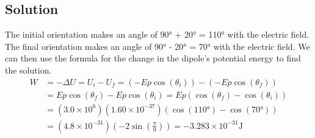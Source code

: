\documentclass[12pt]{article}
\begin{document}
\subsection*{Solution}
The initial orientation makes an angle of 90\unit{\degree} + 20\unit{\degree} = 110\unit{\degree} with the electric field.
The final orientation makes an angle of 90\unit{\degree} - 20\unit{\degree} = 70\unit{\degree} with the electric field.
We can then use the formula for the change in the dipole's potential energy to find the solution.
\begin{align*}
    W   &=  -\Delta U
        =   U_i - U_f
        =   (-Ep\cos(\theta_i)) - (-Ep\cos(\theta_f))\\
        &=  Ep\cos(\theta_f) - Ep\cos(\theta_i)
        =   Ep(\cos(\theta_f) - \cos(\theta_i))\\
        &=  (3.0 \times 10^6)(1.60 \times 10^{-37})(\cos(110\unit{\degree}) - \cos(70\unit{\degree}))\\
        &=  \left(4.8 \times 10^{-31}\right)\left(-2\sin\left(\frac{\pi}{9}\right)\right)
        =   \boxed{-3.283 \times 10^{-31} \unit{\joule}}
\end{align*}
\end{document}
